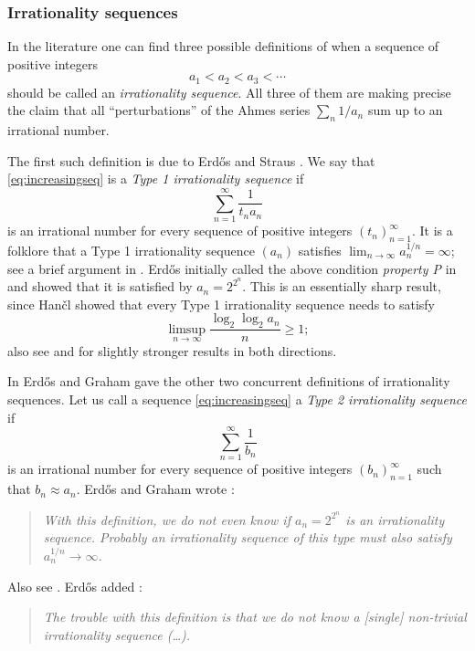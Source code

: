 \documentclass[11pt,letterpaper,reqno]{amsart}
\numberwithin{equation}{section}
\theoremstyle{definition}
\numberwithin{equation}{section}
\begin{document}

\subsubsection{Irrationality sequences}
In the literature one can find three possible definitions of when a sequence of positive integers
\begin{equation}\label{eq:increasingseq}
a_1<a_2<a_3<\cdots
\end{equation}
should be called an \emph{irrationality sequence}.
All three of them are making precise the claim that all ``perturbations'' of the Ahmes series $\sum_n 1/a_n$ sum up to an irrational number.

The first such definition is due to Erd\H{o}s and Straus \cite[p.~2--3]{E75}.
We say that \eqref{eq:increasingseq} is a \emph{Type 1 irrationality sequence} if
\[ \sum_{n=1}^{\infty} \frac{1}{t_n a_n} \]
is an irrational number for every sequence of positive integers $(t_n)_{n=1}^{\infty}$.
It is a folklore that a Type 1 irrationality sequence $(a_n)$ satisfies $\lim_{n\to\infty}a_n^{1/n}=\infty$; see a brief argument in \cite[p.~63]{EG80}.
Erd\H{o}s initially called the above condition \emph{property P} in \cite{E75} and showed that it is satisfied by $a_n=2^{2^n}$.
This is an essentially sharp result, since Han\v{c}l \cite[Corollary 2]{Han91} showed that every Type 1 irrationality sequence needs to satisfy
\[ \limsup_{n\to\infty} \frac{\log_2 \log_2 a_n}{n} \geqslant 1; \]
also see \cite[Theorem 2]{Han91} and \cite[Corollary 3]{HSS08} for slightly stronger results in both directions.

\smallskip
In \cite[p.~63]{EG80} Erd\H{o}s and Graham gave the other two concurrent definitions of irrationality sequences.
Let us call a sequence \eqref{eq:increasingseq} a \emph{Type 2 irrationality sequence} if
\[ \sum_{n=1}^{\infty}\frac{1}{b_n} \]
is an irrational number for every sequence of positive integers $(b_n)_{n=1}^{\infty}$ such that $b_n\approx a_n$.
Erd\H{o}s and Graham wrote \cite[p.~63]{EG80}:
\begin{quote}
\emph{With this definition, we do not even know if $a_n=2^{2^n}$ is an irrationality sequence. Probably an irrationality sequence of this type must also satisfy $a_n^{1/n}\to\infty$.}
\end{quote}
Also see \cite[Problem \#263]{EP}.
Erd\H{o}s added \cite[p.~105]{Erd88}:
\begin{quote}
\emph{The trouble with this definition is that we do not know a [single] non-trivial irrationality sequence (\ldots).}
\end{quote}
\end{document}
